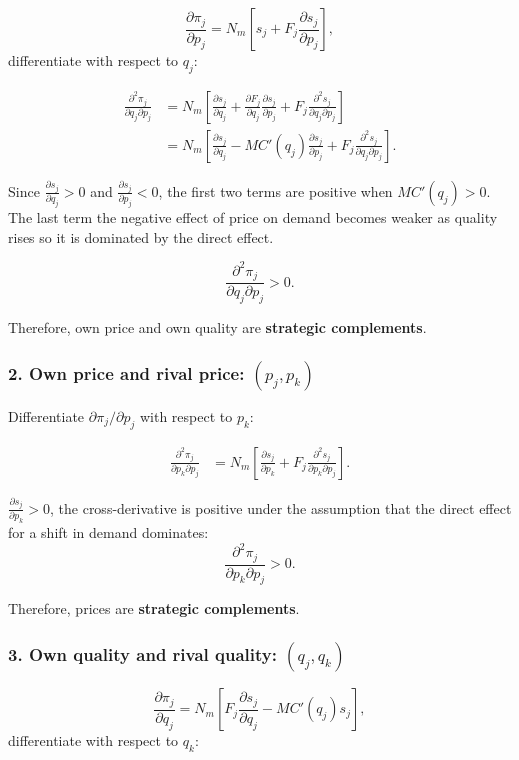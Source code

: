 \documentclass[12pt]{article}
\begin{document}
\[
\frac{\partial \pi_j}{\partial p_j}
=
N_m\left[
s_j + F_j\frac{\partial s_j}{\partial p_j}
\right],
\]
differentiate with respect to $q_j$:

\begin{align}
\frac{\partial^2 \pi_j}{\partial q_j \partial p_j}
&=
N_m\left[
\frac{\partial s_j}{\partial q_j}
+
\frac{\partial F_j}{\partial q_j}\frac{\partial s_j}{\partial p_j}
+
F_j\frac{\partial^2 s_j}{\partial q_j \partial p_j}
\right] \\
&=
N_m\left[
\frac{\partial s_j}{\partial q_j}
-
MC'(q_j)\frac{\partial s_j}{\partial p_j}
+
F_j\frac{\partial^2 s_j}{\partial q_j \partial p_j}
\right].
\end{align}

Since $\frac{\partial s_j}{\partial q_j}>0$ and $\frac{\partial s_j}{\partial p_j}<0$, the first two terms are positive when $MC'(q_j)>0$. The last term the negative effect of price on demand becomes weaker as quality rises so it is dominated by the direct effect. 

\[
\frac{\partial^2 \pi_j}{\partial q_j \partial p_j}>0.
\]

Therefore, own price and own quality are \textbf{strategic complements}.

\subsubsection*{2. Own price and rival price: $(p_j,p_k)$}

Differentiate $\partial \pi_j / \partial p_j$ with respect to $p_k$:

\begin{align}
\frac{\partial^2 \pi_j}{\partial p_k \partial p_j}
&=
N_m\left[
\frac{\partial s_j}{\partial p_k}
+
F_j\frac{\partial^2 s_j}{\partial p_k \partial p_j}
\right].
\end{align}

$\frac{\partial s_j}{\partial p_k}>0$, the cross-derivative is positive under the assumption that the direct effect for a shift in demand dominates:
\[
\frac{\partial^2 \pi_j}{\partial p_k \partial p_j}>0.
\]

Therefore, prices are \textbf{strategic complements}.

\subsubsection*{3. Own quality and rival quality: $(q_j,q_k)$}

\[
\frac{\partial \pi_j}{\partial q_j}
=
N_m\left[
F_j\frac{\partial s_j}{\partial q_j}
-
MC'(q_j)s_j
\right],
\]
differentiate with respect to $q_k$:
\end{document}
